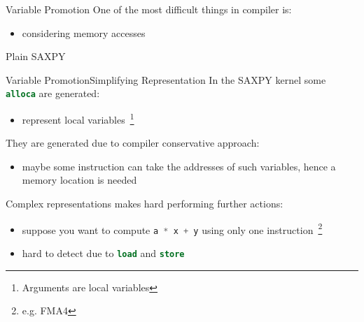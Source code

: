 \documentclass[10pt,mathserif]{beamer}
\newcommand{\cinline}[1]{\lstinline[language=C]!#1!}
\newcommand{\llvminput}[1]{}
\newcommand{\llvminline}[1]{\lstinline[language=LLVM]!#1!}
\begin{document}
\begin{frame}{Variable Promotion}
One of the most difficult things in compiler is:

\begin{itemize}
\item considering memory accesses
\end{itemize}

\begin{block}{Plain SAXPY}
\centering
\llvminput{snippet/02/plain-saxpy.ll}
\end{block}
\end{frame}

\begin{frame}{Variable Promotion}{Simplifying Representation}
In the SAXPY kernel some \llvminline{alloca} are generated:

\begin{itemize}
\item represent \alert{local variables}~\footnote{Arguments are local variables}
\end{itemize}

They are generated due to compiler \alert{conservative} approach:

\begin{itemize}
\item maybe some instruction can take the addresses of such variables, hence a
      memory location is needed
\end{itemize}

Complex representations makes hard performing further actions:

\begin{itemize}
\item suppose you want to compute \cinline{a * x + y} using only one
      instruction~\footnote{e.g. FMA4}
\item hard to detect due to \llvminline{load} and \llvminline{store}
\end{itemize}
\end{frame}
\end{document}
